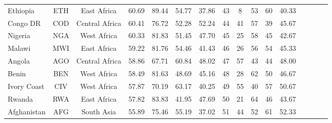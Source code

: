 \begin{singlespace}
{\begin{longtable}[H]{lccccccccccccccc}
Ethiopia                          & ETH           & East Africa        & 60.69       & 89.44            & 54.77                     & 37.86           & 43             & 8                   & 53                           & 60                 & 40.33                  \\
Congo DR & COD           & Central Africa     & 60.41       & 76.72            & 52.28                     & 52.24           & 44             & 41                  & 57                           & 39                 & 45.67                  \\
Nigeria                           & NGA           & West Africa        & 60.33       & 81.83            & 51.45                     & 47.70           & 45             & 25                  & 58                           & 45                 & 42.67                  \\
Malawi                            & MWI           & East Africa        & 59.22       & 81.76            & 54.46                     & 41.43           & 46             & 26                  & 56                           & 54                 & 45.33                  \\
Angola                            & AGO           & Central Africa     & 58.86       & 67.71            & 60.84                     & 48.02           & 47             & 57                  & 43                           & 44                 & 48.00                  \\
Benin                             & BEN           & West Africa        & 58.49       & 81.63            & 48.69                     & 45.16           & 48             & 28                  & 62                           & 50                 & 46.67                  \\
Ivory Coast                     & CIV           & West Africa        & 57.87       & 70.19            & 63.17                     & 40.25           & 49             & 55                  & 40                           & 57                 & 50.67                  \\
Rwanda                            & RWA           & East Africa        & 57.82       & 83.83            & 41.95                     & 47.69           & 50             & 21                  & 64                           & 46                 & 43.67                  \\
Afghanistan                       & AFG           & South Asia         & 55.89       & 75.46            & 55.19                     & 37.02           & 51             & 44                  & 52                           & 61                 & 52.33                  \\

\end{longtable}}
\end{singlespace}
